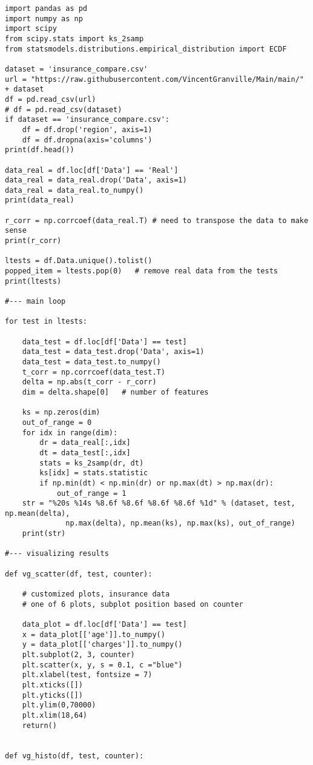 \documentclass[oneside,10pt]{book}
\begin{document}
\begin{lstlisting}
import pandas as pd
import numpy as np
import scipy
from scipy.stats import ks_2samp
from statsmodels.distributions.empirical_distribution import ECDF

dataset = 'insurance_compare.csv'
url = "https://raw.githubusercontent.com/VincentGranville/Main/main/" + dataset 
df = pd.read_csv(url)
# df = pd.read_csv(dataset)
if dataset == 'insurance_compare.csv':
    df = df.drop('region', axis=1)
    df = df.dropna(axis='columns')
print(df.head())

data_real = df.loc[df['Data'] == 'Real']
data_real = data_real.drop('Data', axis=1)
data_real = data_real.to_numpy()
print(data_real)

r_corr = np.corrcoef(data_real.T) # need to transpose the data to make sense
print(r_corr)

ltests = df.Data.unique().tolist()
popped_item = ltests.pop(0)   # remove real data from the tests
print(ltests)

#--- main loop

for test in ltests:

    data_test = df.loc[df['Data'] == test]
    data_test = data_test.drop('Data', axis=1)
    data_test = data_test.to_numpy()
    t_corr = np.corrcoef(data_test.T) 
    delta = np.abs(t_corr - r_corr)
    dim = delta.shape[0]   # number of features
  
    ks = np.zeros(dim)
    out_of_range = 0
    for idx in range(dim):
        dr = data_real[:,idx]
        dt = data_test[:,idx]
        stats = ks_2samp(dr, dt)
        ks[idx] = stats.statistic
        if np.min(dt) < np.min(dr) or np.max(dt) > np.max(dr):
            out_of_range = 1
    str = "%20s %14s %8.6f %8.6f %8.6f %8.6f %1d" % (dataset, test, np.mean(delta), 
              np.max(delta), np.mean(ks), np.max(ks), out_of_range)
    print(str)

#--- visualizing results

def vg_scatter(df, test, counter):

    # customized plots, insurance data 
    # one of 6 plots, subplot position based on counter

    data_plot = df.loc[df['Data'] == test]
    x = data_plot[['age']].to_numpy()
    y = data_plot[['charges']].to_numpy()
    plt.subplot(2, 3, counter)
    plt.scatter(x, y, s = 0.1, c ="blue")
    plt.xlabel(test, fontsize = 7)
    plt.xticks([])
    plt.yticks([])
    plt.ylim(0,70000)
    plt.xlim(18,64)
    return()


def vg_histo(df, test, counter):


\end{lstlisting}
\end{document}
